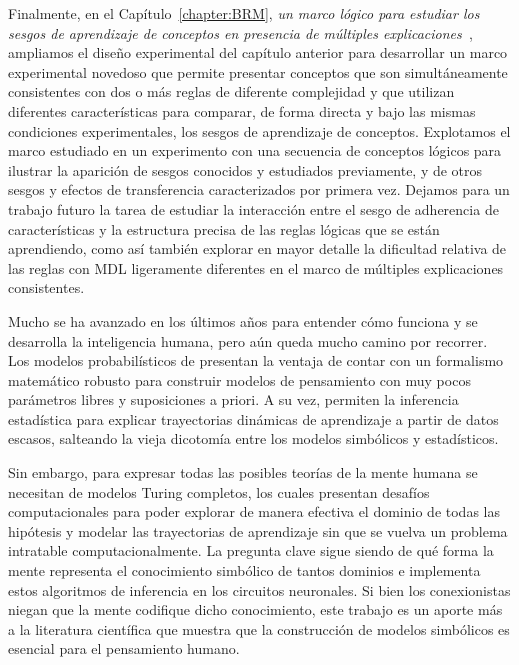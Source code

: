 Finalmente, en el Capítulo~\ref{chapter:BRM}, \textit{un marco lógico para estudiar los sesgos de aprendizaje de conceptos en presencia de múltiples explicaciones~\cite{tano2021framework}}, ampliamos el diseño experimental del capítulo anterior para desarrollar un marco experimental novedoso que permite presentar conceptos que son simultáneamente consistentes con dos o más reglas de diferente complejidad y que utilizan diferentes características para comparar, de forma directa y bajo las mismas condiciones experimentales, los sesgos de aprendizaje de conceptos. Explotamos el marco estudiado en un experimento con una secuencia de conceptos lógicos para ilustrar la aparición de sesgos conocidos y estudiados previamente, y de otros sesgos y efectos de transferencia caracterizados por primera vez. Dejamos para un trabajo futuro la tarea de estudiar la interacción entre el sesgo de adherencia de características y la estructura precisa de las reglas lógicas que se están aprendiendo, como así también explorar en mayor detalle la dificultad relativa de las reglas con MDL ligeramente diferentes en el marco de múltiples explicaciones consistentes.

\bigskip

Mucho se ha avanzado en los últimos años para entender cómo funciona y se desarrolla la inteligencia humana, pero aún queda mucho camino por recorrer. Los modelos probabilísticos de \lot presentan la ventaja de contar con un formalismo matemático robusto para construir modelos de pensamiento con muy pocos parámetros libres y suposiciones a priori. A su vez, permiten la inferencia estadística para explicar trayectorias dinámicas de aprendizaje a partir de datos escasos, salteando la vieja dicotomía entre los modelos simbólicos y estadísticos.

Sin embargo, para expresar todas las posibles teorías de la mente humana se necesitan de modelos \lot Turing completos, los cuales presentan desafíos computacionales para poder explorar de manera efectiva el dominio de todas las hipótesis y modelar las trayectorias de aprendizaje sin que se vuelva un problema intratable computacionalmente. La pregunta clave sigue siendo de qué forma la mente representa el conocimiento simbólico de tantos dominios e implementa estos algoritmos de inferencia en los circuitos neuronales. Si bien los conexionistas niegan que la mente codifique dicho conocimiento, este trabajo es un aporte más a la literatura científica que muestra que la construcción de modelos simbólicos es esencial para el pensamiento humano.